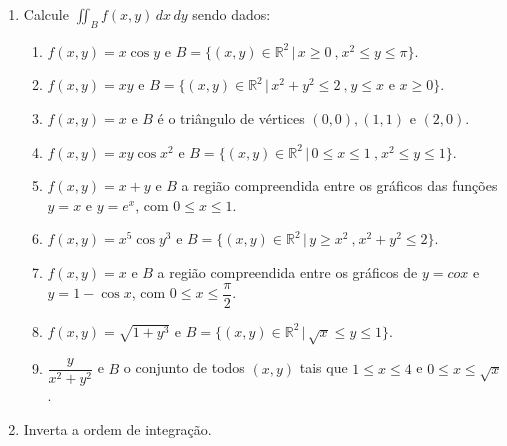 \documentclass[11pt,a4paper]{article}
\begin{document}
\begin{enumerate}
		\item Calcule $\displaystyle\iint_B f(x,y) \,dx\,dy$ sendo dados:
		\begin{enumerate}
			\item $f(x,y) = x \cos y$ e $B = \{(x,y) \in \mathbb{R}^2 \,|\, x \geq 0\ \textrm{,}\ x^2 \leq y \leq \pi \}$.
			\item $f(x,y) = xy$ e $B = \{(x,y) \in \mathbb{R}^2 \,|\, x^2 + y^2 \leq 2\ \textrm{,}\ y \leq x  \textrm{ e } x \geq 0 \}$.
			\item $f(x,y) = x$ e $B$ é o triângulo de vértices $(0,0),(1,1) \textrm{ e } (2,0)$.
			\item $f(x,y) = xy \cos x^2$ e $B = \{(x,y) \in \mathbb{R}^2 \,|\, 0 \leq x \leq 1\ \textrm{,}\ x^2 \leq y \leq 1\}$.
			\item $f(x,y) = x + y$ e $B$ a região compreendida entre os gráficos das funções $y = x$ e $y = e^x$, com $0 \leq x \leq 1$.
			\item $f(x,y) = x^5 \cos y^3$ e $B = \{(x,y) \in \mathbb{R}^2 \,|\, y \geq x^2\ \textrm{,}\ x^2 + y^2 \leq 2 \}$. 
			\item $f(x,y) = x$ e $B$ a região compreendida entre os gráficos de $y = cox$ e $y = 1 - \cos x$, com $0 \leq x \leq \dfrac{\pi}{2}$.
			\item $f(x,y) = \sqrt{1 + y^3}$ e $B = \{(x,y) \in \mathbb{R}^2 \,|\, \sqrt{x} \leq y \leq 1 \}$.
			\item $\displaystyle\dfrac{y}{x^2 + y^2}$ e $B$ o conjunto de todos $(x,y)$ tais que $1 \leq x \leq 4$ e $0 \leq x \leq \sqrt{x}$.
			
		\end{enumerate}
		\item Inverta a ordem de integração.
		

\end{enumerate}
\end{document}
